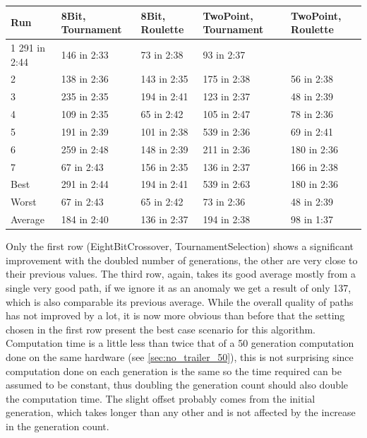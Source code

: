 \begin{center}
	\begin{tabular}{| l | l | l | p{3cm} | p{3cm}|}
		\hline
		Run 		& 8Bit, Tournament 	& 8Bit, Roulette 	& TwoPoint, Tournament 	& TwoPoint, Roulette	\\ \hline
		1				291 in 2:44					&	146 in 2:33			&	73 in 2:38						&	93 in 2:37					\\ \hline
		2				&	138 in 2:36				&	143 in 2:35			&	175 in 2:38						&	56 in 2:38					\\ \hline
		3				&	235 in 2:35				&	194 in 2:41			&	123 in 2:37						&	48 in 2:39					\\ \hline
		4				&	109 in 2:35				&	65 in 2:42			&	105 in 2:47						&	78 in 2:36					\\ \hline
		5				&	191 in 2:39				&	101 in 2:38			&	539 in 2:36						&	69 in 2:41					\\ \hline
		6				&	259 in 2:48				&	148 in 2:39			&	211 in 2:36						&	180 in 2:36					\\ \hline
		7				&	67 in 2:43				&	156 in 2:35			&	136 in 2:37						&	166 in 2:38					\\ \hline
		Best		&	291 in 2:44				&	194 in 2:41			&	539 in 2:63						&	180 in 2:36					\\ \hline
		Worst		&	67 in 2:43				&	65 in 2:42			&	73 in 2:36						& 48 in 2:39					\\ \hline
		Average	&	184 in 2:40				& 136 in 2:37			& 194 in 2:38						&	98 in 1:37					\\ \hline
		\hline
	\end{tabular}
\end{center}

Only the first row (EightBitCrossover, TournamentSelection) shows a significant improvement with the doubled number of generations, the other are very close to their previous values. The third row, again, takes its good average mostly from a single very good path, if we ignore it as an anomaly we get a result of only 137, which is also comparable its previous average. While the overall quality of paths has not improved by a lot, it is now more obvious than before that the setting chosen in the first row present the best case scenario for this algorithm. Computation time is a little less than twice that of a 50 generation computation done on the same hardware (see \ref{sec:no_trailer_50}), this is not surprising since computation done on each generation is the same so the time required can be assumed to be constant, thus doubling the generation count should also double the computation time. The slight offset probably comes from the initial generation, which takes longer than any other and is not affected by the increase in the generation count.

